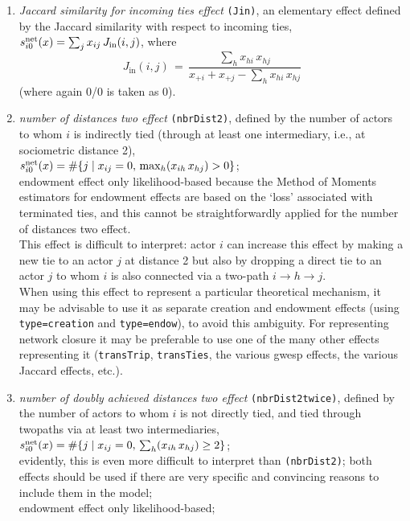 \documentclass[a4paper,fleqn,11pt]{article}
\newcommand{\+}{\, + \,}
\newcommand{\vit}{\theenumi}
\begin{document}
\begin{enumerate}
 \noindent
 Since the Jaccard measure has smaller variability than a lot of other
 effects, the parameter estimates of this will often be larger,
 with correspondingly larger standard errors,
 than many other parameter estimates. The same holds for
 the other Jaccard similarity effects.

 \item {\em Jaccard similarity for incoming ties effect} \texttt{(Jin)},
 an elementary effect defined by
 the Jaccard similarity with respect to incoming ties,\\
 $s^{\rm net}_{i\vit}(x) =  \sum_j x_{ij} \, J_{\text{in}}(i,j)$, where
 \[
 J_{\text{in}}(i,j) \,=\, \frac{\sum_h x_{hi}\,x_{hj}}
                     {x_{+i} + x_{+j} - \sum_h x_{hi}\,x_{hj}}
 \]
 (where again 0/0 is taken as 0).

 \item {\em number of distances two effect} \texttt{(nbrDist2)},
 \hypertarget{T_dist2}{defined by}
 the number of actors to whom $i$ is indirectly tied
 (through at least one intermediary, i.e., at sociometric distance 2),\\
 $s^{\rm net}_{i\vit}(x) =  \#\{j \mid x_{ij} = 0,\, \max_h (x_{ih}\, x_{hj}) > 0 \}$;\\
 endowment effect only likelihood-based because the Method of Moments
 estimators for endowment effects are based on the `loss' associated
 with terminated ties, and this cannot be straightforwardly applied
 for the number of distances two effect.\\
 This effect is difficult to interpret: actor $i$ can increase this effect by making a
 new tie to an actor $j$ at distance 2 but also by dropping a direct tie to an
 actor $j$ to whom $i$ is also connected via a two-path
 $i \rightarrow h \rightarrow j$.\\
 When using this effect to represent a particular theoretical mechanism,
 it may be advisable to use it as separate creation
 and endowment effects (using  \texttt{type=creation} and \texttt{type=endow}),
 to avoid this ambiguity.
 For representing network closure it may be preferable to use one of the many other
 effects representing it (\texttt{transTrip}, \texttt{transTies},
 the various gwesp effects, the various Jaccard effects, etc.).\\


 \item {\em number of doubly achieved distances two effect} \texttt{(nbrDist2twice)},
 defined by
 the number of actors to whom $i$
 is not directly tied, and tied through twopaths via at least two intermediaries,\\
 $s^{\rm net}_{i\vit}(x) =  \#\{j \mid x_{ij} = 0,\, \sum_h (x_{ih}\, x_{hj}) \geq 2 \}$;\\
 evidently, this is even more difficult to interpret than \texttt{(nbrDist2)};
 both effects should be used if there are very specific
 and convincing reasons to include them in the model;\\
 endowment effect only likelihood-based;\\



\end{enumerate}
\end{document}
